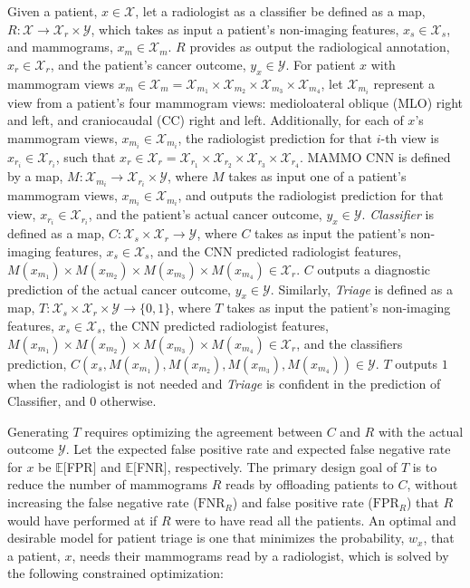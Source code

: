\documentclass[journal]{IEEEtran}
\begin{document}
Given a patient, $x \in \mathcal{X}$, let a radiologist as a classifier be defined as a map, $R: \mathcal{X} \rightarrow \mathcal{X}_r \times \mathcal{Y}$, which takes as input a patient's non-imaging features, $x_s \in \mathcal{X}_s$, and mammograms, $x_m \in \mathcal{X}_m$. $R$ provides as output the radiological annotation, $x_r \in \mathcal{X}_r$, and the patient's cancer outcome, $y_x \in \mathcal{Y}$.  
For patient $x$ with mammogram views $x_m \in \mathcal{X}_m = \mathcal{X}_{m_1} \times \mathcal{X}_{m_2} \times \mathcal{X}_{m_3} \times \mathcal{X}_{m_4}$, let $\mathcal{X}_{m_i}$ represent a view from a patient's four mammogram views: medioloateral oblique (MLO) right and left, and craniocaudal (CC) right and left.   Additionally, for each of $x$'s mammogram views, $x_{m_i} \in \mathcal{X}_{m_i}$, the radiologist prediction for that $i$-th view is $x_{r_i} \in \mathcal{X}_{r_i}$, such that $x_r \in \mathcal{X}_r =  \mathcal{X}_{r_1} \times \mathcal{X}_{r_2} \times \mathcal{X}_{r_3} \times \mathcal{X}_{r_4}$.
MAMMO CNN is defined by a map, $M: \mathcal{X}_{m_i} \rightarrow \mathcal{X}_{r_i}  \times \mathcal{Y}$, where $M$ takes as input one of a patient's mammogram views, $x_{m_i} \in \mathcal{X}_{m_i}$, and outputs the radiologist prediction for that view, $x_{r_i} \in \mathcal{X}_{r_i}$,  and the patient's actual cancer outcome, $y_x \in \mathcal{Y}$. \textit{Classifier} is defined as a map, $C :  \mathcal{X}_s \times \mathcal{X}_r \rightarrow \mathcal{Y}$, where $C$ takes as input the patient's non-imaging features, $x_s \in \mathcal{X}_s$, and the CNN predicted radiologist features, $M(x_{m_1}) \times M(x_{m_2}) \times M(x_{m_3}) \times M(x_{m_4}) \in \mathcal{X}_r$. $C$ outputs a diagnostic prediction of the actual cancer outcome, $y_x \in \mathcal{Y}$.
Similarly, \textit{Triage} is defined as a map, $T : \mathcal{X}_s \times \mathcal{X}_r \times \mathcal{Y} \to \{0, 1\}$, where $T$ takes as input the patient's non-imaging features, $x_s \in \mathcal{X}_s$, the CNN predicted radiologist features,  $M(x_{m_1}) \times M(x_{m_2}) \times M(x_{m_3}) \times M(x_{m_4}) \in \mathcal{X}_r$, and the classifiers prediction, $C(x_s, M(x_{m_1}), M(x_{m_2}), M(x_{m_3}), M(x_{m_4}) ) \in \mathcal{Y}$. $T$ outputs $1$ when the radiologist is not needed and \textit{Triage} is confident in the prediction of Classifier, and $0$ otherwise.


Generating $T$ requires optimizing the agreement between $C$ and $R$ with the actual outcome $\mathcal{Y}$. 
Let the expected false positive rate and expected false negative rate for $x$ be $\mathbb{E}[$FPR$]$ and $\mathbb{E}[$FNR$]$, respectively.  The primary design goal of $T$ is to reduce the number of mammograms $R$ reads by offloading patients to $C$, without increasing the false negative rate ($\text{FNR}_{R}$) and false positive rate  ($\text{FPR}_{R}$) that $R$ would have performed at if $R$ were to have read all the patients. An optimal and desirable model for patient triage is one that minimizes the probability, $w_x$, that a patient, $x$, needs their mammograms read by a radiologist, which is solved by the following constrained optimization:
\end{document}
